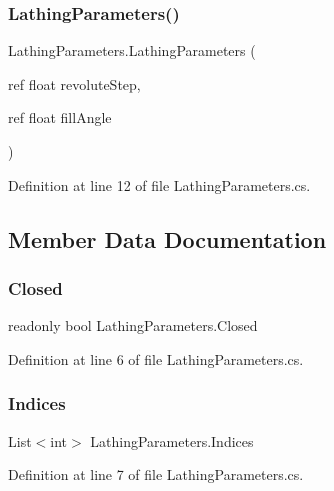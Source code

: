 \subsubsection{\texorpdfstring{LathingParameters()}{LathingParameters()}}
{\footnotesize\ttfamily Lathing\+Parameters.\+Lathing\+Parameters (\begin{DoxyParamCaption}\item[{ref float}]{revolute\+Step,  }\item[{ref float}]{fill\+Angle }\end{DoxyParamCaption})}



Definition at line 12 of file Lathing\+Parameters.\+cs.



\subsection{Member Data Documentation}
\mbox{\label{class_lathing_parameters_a35b9527f47662b6122dacf4be86f8ea2}} 
\subsubsection{\texorpdfstring{Closed}{Closed}}
{\footnotesize\ttfamily readonly bool Lathing\+Parameters.\+Closed}



Definition at line 6 of file Lathing\+Parameters.\+cs.

\mbox{\label{class_lathing_parameters_a6de58dd4768f3e0e1c8ef0856b28370a}} 
\subsubsection{\texorpdfstring{Indices}{Indices}}
{\footnotesize\ttfamily List$<$int$>$ Lathing\+Parameters.\+Indices}



Definition at line 7 of file Lathing\+Parameters.\+cs.

\mbox{\label{class_lathing_parameters_a13c433ad2852ca57878eea751fb7c648}} 
